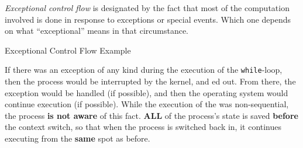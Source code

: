 \begin{definition}\label{def:Exceptional_Control_Flow}
  \emph{Exceptional control flow} is designated by the fact that most of the computation involved is done in response to exceptions or special events.
  Which one depends on what ``exceptional'' means in that circumstance.
\end{definition}

\begin{listing}[h!tbp]
\caption{Exceptional Control Flow Example}
\label{lst:Exceptional_Control_Flow}
\end{listing}

If there was an exception of any kind during the execution of the \texttt{while}-loop, then the process would be interrupted by the kernel, and ed out.
From there, the exception would be handled (if possible), and then the operating system would continue execution (if possible).
While the execution of the  was non-sequential, the process \textbf{is not aware} of this fact.
{\large\textbf{ALL}} of the process's state is saved \textbf{before} the context switch, so that when the process is switched back in, it continues executing from the \textbf{same} spot as before.


